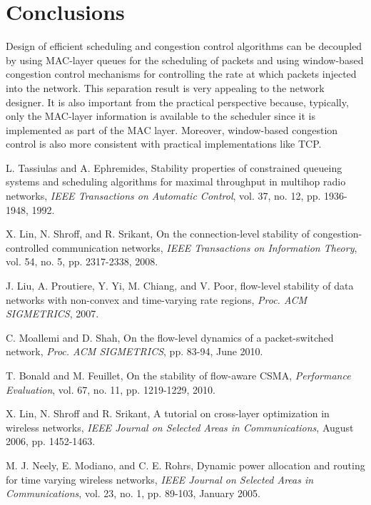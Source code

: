 \documentclass[10pt,onecolumn,draftclsnofoot,journal]{IEEEtran}
\begin{document}
\section{Conclusions}\label{conclusion}
Design of efficient scheduling and congestion control algorithms can be decoupled by using MAC-layer queues for the scheduling of packets and using window-based congestion control mechanisms for controlling the rate at which packets injected into the network. This separation result is very appealing to the network designer. It is also important from the practical perspective because, typically, only the MAC-layer information is available to the scheduler since it is implemented as part of the MAC layer. Moreover, window-based congestion control is also more consistent with practical implementations like TCP.
\begin{thebibliography}{99}

L. Tassiulas and A. Ephremides, Stability properties of constrained
queueing systems and scheduling algorithms for maximal throughput in
multihop radio networks, \emph{IEEE Transactions on Automatic Control}, vol. 37, no. 12, pp. 1936-1948, 1992.

X. Lin, N. Shroff, and R. Srikant, On the connection-level stability of congestion-controlled communication networks, \emph{IEEE Transactions on Information Theory}, vol. 54, no. 5, pp. 2317-2338, 2008.



 J. Liu, A. Proutiere, Y. Yi, M. Chiang, and V. Poor, flow-level stability of
data networks with non-convex and time-varying rate regions, \emph{Proc. ACM SIGMETRICS}, 2007.

 C. Moallemi and D. Shah, On the flow-level dynamics of a packet-switched network, \emph{Proc. ACM SIGMETRICS}, pp. 83-94, June 2010.





T. Bonald and M. Feuillet, On the stability of flow-aware CSMA, \emph{Performance Evaluation}, vol. 67, no. 11, pp. 1219-1229, 2010.

 X. Lin, N. Shroff and R. Srikant, A tutorial on cross-layer optimization in wireless networks, \emph{IEEE Journal on Selected Areas in Communications}, August 2006, pp. 1452-1463.

 M. J. Neely, E. Modiano, and C. E. Rohrs, Dynamic power allocation and routing for time varying wireless networks, \emph{IEEE Journal on Selected Areas in Communications}, vol. 23, no. 1, pp. 89-103, January 2005.


\end{thebibliography}
\end{document}
